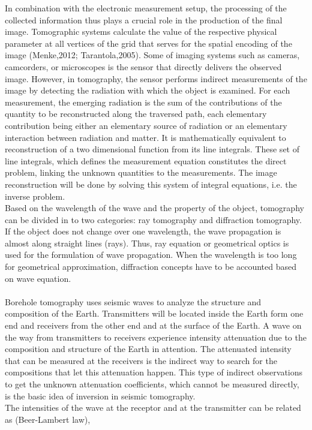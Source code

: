 \documentclass[12pt,A4]{article}
\begin{document}
In combination with the electronic measurement setup, the processing of the collected information thus plays a crucial role in the production of the final image. Tomographic systems calculate the value of the respective physical parameter at all vertices of the grid that serves for the spatial encoding of the image (Menke,2012; Tarantola,2005). Some of imaging systems such as cameras, camcorders, or microscopes is the sensor that directly delivers the observed image. However, in tomography, the sensor performs indirect measurements of the image by detecting the radiation with which the object is examined. For each measurement, the emerging radiation is the sum of the contributions of the quantity to be reconstructed along the traversed path, each elementary contribution being either an elementary source of radiation or an elementary interaction between radiation and matter. It is mathematically equivalent to reconstruction of a two dimensional function from its line integrals. These set of line integrals, which defines the measurement equation constitutes the direct problem, linking the unknown quantities to the measurements. The image reconstruction will be done by solving this system of integral equations, i.e. the inverse problem.\\
Based on the wavelength of the wave and the property of the object, tomography can be divided in to two categories: ray tomography and diffraction tomography. If the object does not change over one wavelength, the wave propagation is almost along straight lines (rays). Thus, ray equation or geometrical optics is used for the formulation of wave propagation. When the wavelength is too long for geometrical approximation, diffraction concepts have to be accounted based on wave equation. 
\\\\
Borehole tomography uses seismic waves to analyze the structure and composition of the Earth. Transmitters will be located inside the Earth form one end and receivers from the other end and at the surface of the Earth. A wave on the way from transmitters to receivers experience intensity attenuation due to the composition and structure of the Earth in attention. The attenuated intensity that can be measured at the receivers is the indirect way to search for the compositions that let this attenuation happen. This type of indirect observations to get the unknown attenuation coefficients, which cannot be measured directly, is the basic idea of inversion in seismic tomography. \\
The intensities of the wave at the receptor and at the transmitter can be related as (Beer-Lambert law),
\end{document}
